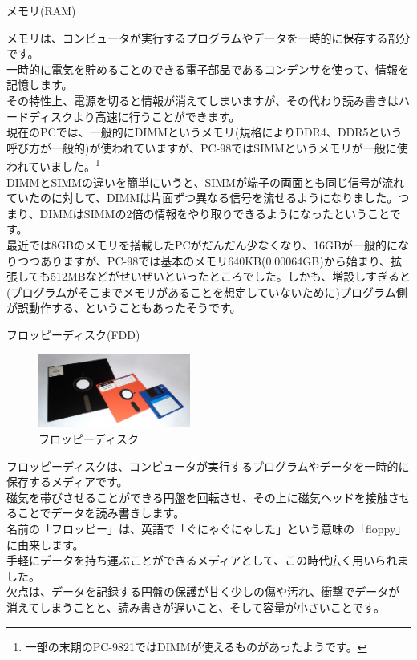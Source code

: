 \documentclass[b5paper,9pt,platex,dvipdfmx]{jsarticle}
\begin{document}
\begin{multicols}{3}
\begin{enumerate}
  {\bf  \item メモリ(RAM)\\}
  メモリは、コンピュータが実行するプログラムやデータを一時的に保存する部分です。\\
  一時的に電気を貯めることのできる電子部品であるコンデンサを使って、情報を記憶します。\\
  その特性上、電源を切ると情報が消えてしまいますが、その代わり読み書きはハードディスクより高速に行うことができます。\\
  現在のPCでは、一般的にDIMMというメモリ(規格によりDDR4、DDR5という呼び方が一般的)が使われていますが、PC-98ではSIMMというメモリが一般に使われていました。\footnote{一部の末期のPC-9821ではDIMMが使えるものがあったようです。}\\
  DIMMとSIMMの違いを簡単にいうと、SIMMが端子の両面とも同じ信号が流れていたのに対して、DIMMは片面ずつ異なる信号を流せるようになりました。つまり、DIMMはSIMMの2倍の情報をやり取りできるようになったということです。\\
  最近では8GBのメモリを搭載したPCがだんだん少なくなり、16GBが一般的になりつつありますが、PC-98では基本のメモリ640KB(0.00064GB)から始まり、拡張しても512MBなどがせいぜいといったところでした。しかも、増設しすぎると(プログラムがそこまでメモリがあることを想定していないために)プログラム側が誤動作する、ということもあったそうです。\\
  {\bf  \item フロッピーディスク(FDD)\\}
  \begin{figure}[H]
    \centering
    \includegraphics[width=5cm]{img-3.jpg}
    \caption{フロッピーディスク}
  \end{figure}
  フロッピーディスクは、コンピュータが実行するプログラムやデータを一時的に保存するメディアです。\\
  磁気を帯びさせることができる円盤を回転させ、その上に磁気ヘッドを接触させることでデータを読み書きします。\\
  名前の「フロッピー」は、英語で「ぐにゃぐにゃした」という意味の「floppy」に由来します。\\
  手軽にデータを持ち運ぶことができるメディアとして、この時代広く用いられました。\\
  欠点は、データを記録する円盤の保護が甘く少しの傷や汚れ、衝撃でデータが消えてしまうことと、読み書きが遅いこと、そして容量が小さいことです。\\

\end{enumerate}
\end{multicols}
\end{document}
